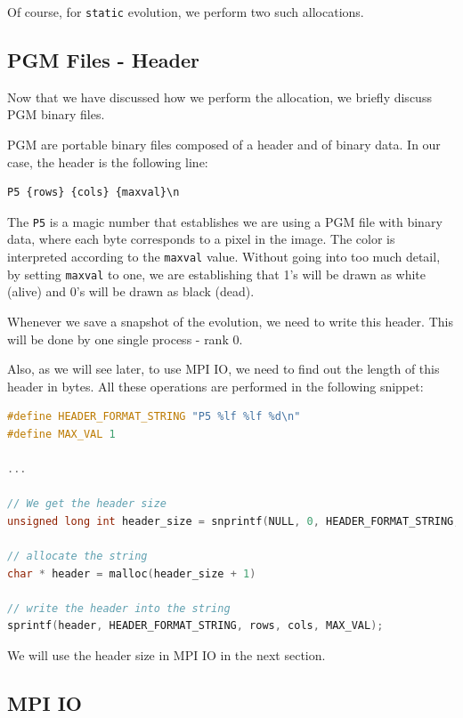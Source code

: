 \documentclass{report}
\begin{document}
Of course, for \texttt{static} evolution, we perform two such allocations.

\subsection{PGM Files - Header}

Now that we have discussed how we perform the allocation, we briefly discuss 
PGM binary files. 

PGM are portable binary files composed of a header and 
of binary data. In our case, the header is the following line: 

\begin{verbatim}
P5 {rows} {cols} {maxval}\n
\end{verbatim}

The \texttt{P5} is a magic number that establishes we are using a PGM file with binary 
data, where each byte corresponds to a pixel in the image. The color 
is interpreted according to the \texttt{maxval} value. Without going 
into too much detail, by setting \texttt{maxval} to one, we are establishing that 
1's will be drawn as white (alive) and 0's will be drawn as black 
(dead).

Whenever we save a snapshot of the evolution, we need to write this header. 
This will be done by one single process - rank 0. 

Also, as we will see later, to use MPI IO, we need to find out the length of 
this header in bytes. All these operations are performed in the following snippet:

\begin{lstlisting}[language=C++]
#define HEADER_FORMAT_STRING "P5 %lf %lf %d\n"
#define MAX_VAL 1

... 

// We get the header size 
unsigned long int header_size = snprintf(NULL, 0, HEADER_FORMAT_STRING, rows, cols, MAX_VAL);

// allocate the string
char * header = malloc(header_size + 1)

// write the header into the string
sprintf(header, HEADER_FORMAT_STRING, rows, cols, MAX_VAL);
\end{lstlisting}

We will use the header size in MPI IO in the next section.

\subsection{MPI IO}
\end{document}
